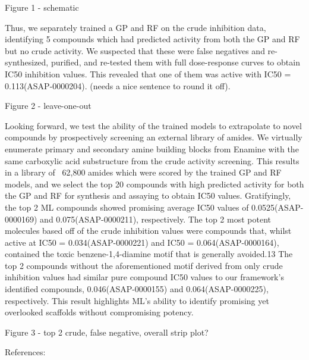 Figure 1 - schematic

Thus, we separately trained a GP and RF on the crude inhibition data, identifying 5 compounds which had predicted activity from both the GP and RF but no crude activity. We suspected that these were false negatives and re-synthesized, purified, and re-tested them with full dose-response curves to obtain IC50 inhibition values. This revealed that one of them was active with IC50 = 0.113\uM (ASAP-0000204). (needs a nice sentence to round it off).

Figure 2 - leave-one-out

Looking forward, we test the ability of the trained models to extrapolate to novel compounds by prospectively screening an external library of amides. We virtually enumerate primary and secondary amine building blocks from Enamine with the same carboxylic acid substructure from the crude activity screening. This results in a library of ~62,800 amides which were scored by the trained GP and RF models, and we select the top 20 compounds with high predicted activity for both the GP and RF for synthesis and assaying to obtain IC50 values. Gratifyingly, the top 2 ML compounds showed promising average IC50 values of 0.0525\uM (ASAP-0000169) and 0.075\uM (ASAP-0000211), respectively. The top 2 most potent molecules based off of the crude inhibition values were compounds that, whilst active at IC50 = 0.034\uM (ASAP-0000221) and IC50 = 0.064\uM (ASAP-0000164), contained the toxic benzene-1,4-diamine motif that is generally avoided.13 The top 2 compounds without the aforementioned motif derived from only crude inhibition values had similar pure compound IC50 values to our framework's identified compounds, 0.046\uM (ASAP-0000155) and 0.064\uM (ASAP-0000225), respectively. This result highlights ML's ability to identify promising yet overlooked scaffolds without compromising potency. 

Figure 3 - top 2 crude, false negative, overall strip plot?

References:


